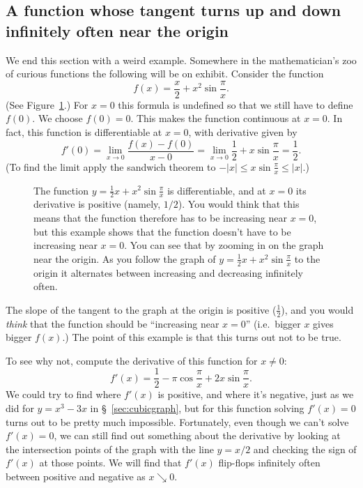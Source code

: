 \subsection{A function whose tangent turns up and down infinitely often near the origin}
We end this section with a weird example.  Somewhere in the
mathematician's zoo of curious functions the following will be on
exhibit.  Consider the function
\[
f(x) = \frac x2+x^2\sin\frac\pi x.
\]
(See Figure~\ref{fig:05zigzagBetweenParabolas}.)  For $x=0$ this
formula is undefined so that we still have to define $f(0)$.  We
choose $f(0)=0$.  This makes the function continuous at $x=0$. In
fact, this function is differentiable at $ x=0 $, with derivative
given by
\[
f'(0) = \lim_{x\to 0}\frac{f(x)-f(0)}{x-0} =\lim_{x\to0} \frac12+x\sin\frac\pi
x=\frac12.
\]
(To find the limit apply the sandwich theorem to $-|x| \leq
x\sin\tfrac\pi x \leq |x|$.)
\begin{figure}[t]
  \centering 
  \caption{The function $y = \frac12 x+ x^{2}\sin\frac\pi x$ is
    differentiable, and at $x=0$ its derivative is positive (namely,
    $1/2$).  You would think that this means that the function
    therefore has to be increasing near $x=0$, but this example shows
    that the function doesn't have to be increasing near $x=0$.  You
    can see that by zooming in on the graph near the origin.  As you
    follow the graph of $y = \frac12 x+ x^{2}\sin\frac\pi x$ to the
    origin it alternates between increasing and decreasing infinitely
    often.  \label{fig:05zigzagBetweenParabolas}}
\end{figure}

\noindent

The slope of the tangent to the graph at the origin is positive
($\frac12$), and you would \textit{think} that the function should be
``increasing near $x=0$'' (i.e.\ bigger $x$ gives bigger $f(x)$.)  The
point of this example is that this turns out not to be true.

To see why not, compute the derivative of this function for
$x\neq0$:
\[
f'(x) = \frac12-\pi\cos\frac\pi x+2x\sin\frac\pi x.
\]
We could try to find where $f'(x)$ is positive, and where it's negative, just as
we did for $y=x^3-3x$ in \S~\ref{sec:cubicgraph}, but for this function solving
$f'(x)=0$ turns out to be pretty much impossible.  Fortunately, even though we
can't solve $f'(x) = 0$, we can still find out something about the derivative by
looking at the intersection points of the graph with the line $y=x/2$ and
checking the sign of $f'(x)$ at those points.  We will find that $f'(x)$
flip-flops infinitely often between positive and negative as $x \searrow 0$.  


